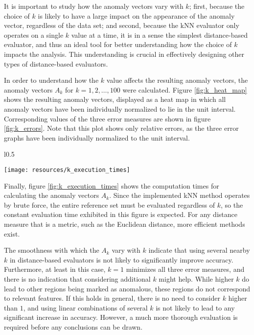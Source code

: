 It is important to study how the anomaly vectors vary with $k$; first, because the choice of $k$ is likely to have a large impact on the appearance of the anomaly vector, regardless of the data set; and second, because the kNN evaluator only operates on a single $k$ value at a time, it is in a sense the simplest distance-based evaluator, and thus an ideal tool for better understanding how the choice of $k$ impacts the analysis. This understanding is crucial in effectively designing other types of distance-based evaluators. 

In order to understand how the $k$ value affects the resulting anomaly vectors, the anomaly vectors $A_{k}$ for $k = 1,2,\dots,100$ were calculated. Figure \ref{fig:k_heat_map} shows the resulting anomaly vectors, displayed as a heat map in which all anomaly vectors have been individually normalized to lie in the unit interval. Corresponding values of the three error measures are shown in figure \ref{fig:k_errors}. Note that this plot shows only relative errors, as the three error graphs have been individually normalized to the unit interval.

\begin{wrapfigure}{l}{0.5\textwidth}
    \vspace{-20pt}
    \begin{center}
        \texttt{[image: resources/k\_execution\_times]}
    \end{center}
    \vspace{-20pt}
    \caption{\small{Evaluation times when varying $k$ on the standard sequence.}}
    \vspace{-20pt}
    \label{fig:k_execution_times}
\end{wrapfigure}

Finally, figure \ref{fig:k_execution_times} shows the computation times for calculating the anomaly vectors $A_k$. Since the implemented kNN method operates by brute force, the entire reference set must be evaluated regardless of $k$, so the constant evaluation time exhibited in this figure is expected. For any distance measure that is a metric, such as the Euclidean distance, more efficient methods exist.

The smoothness with which the $A_k$ vary with $k$ indicate that using several nearby $k$ in distance-based evaluators is not likely to significantly improve accuracy. Furthermore, at least in this case, $k=1$ minimizes all three error measures, and there is no indication that considering additional $k$ might help. While higher $k$ do lead to other regions being marked as anomalous, these regions do not correspond to relevant features. If this holds in general, there is no need to consider $k$ higher than $1$, and using linear combinations of several $k$ is not likely to lead to any significant increase in accuracy. However, a much more thorough evaluation is required before any conclusions can be drawn.


